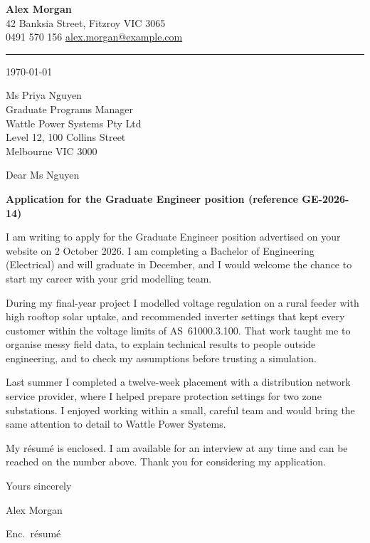 \documentclass[11pt,a4paper]{article}   %
\begin{document}
{\Large\bfseries Alex Morgan}\\[2pt]
42 Banksia Street, Fitzroy VIC 3065\\
0491 570 156 \quad \href{mailto:alex.morgan@example.com}{alex.morgan@example.com}

\rule{\textwidth}{0.4pt}

\today

Ms Priya Nguyen\\
Graduate Programs Manager\\
Wattle Power Systems Pty Ltd\\
Level 12, 100 Collins Street\\
Melbourne VIC 3000

Dear Ms Nguyen

\textbf{Application for the Graduate Engineer position (reference GE-2026-14)}

I am writing to apply for the Graduate Engineer position advertised on your website on
2 October 2026. I am completing a Bachelor of Engineering (Electrical) and will graduate in
December, and I would welcome the chance to start my career with your grid modelling team.

During my final-year project I modelled voltage regulation on a rural feeder with high rooftop
solar uptake, and recommended inverter settings that kept every customer within the voltage
limits of AS~61000.3.100. That work taught me to organise
messy field data, to explain technical results to people outside engineering, and to check my
assumptions before trusting a simulation.

Last summer I completed a twelve-week placement with a distribution network service provider,
where I helped prepare protection settings for two zone substations. I enjoyed working within a
small, careful team and would bring the same attention to detail to Wattle Power Systems.

My résumé is enclosed. I am available for an interview at any time and can be reached on the
number above. Thank you for considering my application.

Yours sincerely

\vspace{1.5cm}%

Alex Morgan

Enc.\ résumé

\printbibliography
\end{document}
